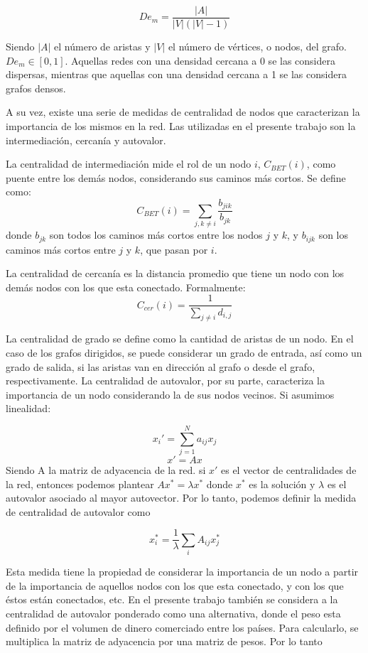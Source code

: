 \documentclass[a4paper]{article}
\begin{document}
$$
De_m = \frac{|A|}{|V|(|V|-1)}
$$

Siendo $|A|$ el número de aristas y $|V|$ el número de vértices, o nodos, del grafo. $De_m \in [0,1]$. Aquellas redes con una densidad cercana a 0 se las considera dispersas, mientras que aquellas con una densidad cercana a 1 se las considera grafos densos. \par

A su vez, existe una serie de medidas de centralidad de nodos que caracterizan la importancia de los mismos en la red. Las utilizadas en el presente trabajo son la intermediación, cercanía y autovalor. \par
La centralidad de intermediación mide el rol de un nodo $i$, $C_{BET}(i)$, como puente entre los demás nodos, considerando sus caminos más cortos. Se define como:
$$
C_{BET}(i) = \sum_{j,k \neq i} \frac{b_{jik}}{b_{jk}}
$$
donde $b_{jk}$ son todos los caminos más cortos entre los nodos $j$ y $k$, y $b_{ijk}$ son los caminos más cortos entre $j$ y $k$, que pasan por $i$. \par
La centralidad de cercanía es la distancia promedio que tiene un nodo con los demás nodos con los que esta conectado. Formalmente: 
$$
C_{cer}(i) = \frac{1}{\displaystyle \sum_{j \neq i} d_{i,j} }
$$

La centralidad de grado se define como la cantidad de aristas de un nodo. En el caso de los grafos dirigidos, se puede considerar un grado de entrada, así como un grado de salida, si las aristas van en dirección al grafo o desde el grafo, respectivamente.
La centralidad de autovalor, por su parte, caracteriza la importancia de un nodo considerando la de sus nodos vecinos. Si asumimos linealidad:

$$
x_i'= \sum_{j=1}^{N} a_{ij}x_{j}
$$
$$
x' = Ax
$$
Siendo A la matriz de adyacencia de la red. si $x'$ es el vector de centralidades de la red, entonces podemos plantear $Ax^* = \lambda x^*$ donde $x^*$ es la solución y  $\lambda$ es el autovalor asociado al mayor autovector.  Por lo tanto, podemos definir la medida de centralidad de autovalor como

$$
x_i^*=\frac{1}{\lambda}  \sum_{i} A_{ij}x_{j}^*
$$

Esta medida tiene la propiedad de considerar la importancia de un nodo a partir de la importancia de aquellos nodos con los que esta conectado, y con los que éstos están conectados, etc. En el presente trabajo también se considera a la centralidad de autovalor ponderado como una alternativa, donde el peso esta definido por el volumen de dinero comerciado entre los países. Para calcularlo, se multiplica la matriz de adyacencia por una matriz de pesos. Por lo tanto
\end{document}
